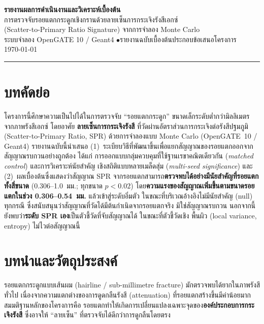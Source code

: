 \documentclass[14pt]{extarticle}
\begin{document}
\begin{center}
{\LARGE\bfseries\color{brand} รายงานผลการดำเนินงานและวิเคราะห์เบื้องต้น}\\[4pt]
{\Large การตรวจจับรอยแตกกระดูกเชิงกรานด้วยลายเซ็นการกระเจิงรังสีเอกซ์}\\
{\large (Scatter-to-Primary Ratio Signature) จากการจำลอง Monte Carlo}\\[8pt]
{\small ระบบจำลอง OpenGATE 10 / Geant4 \quad$\bullet$\quad รายงานฉบับเบื้องต้นประกอบข้อเสนอโครงการ}\\
{\small \today}
\end{center}
\vspace{4pt}
\hrule
\vspace{10pt}

\section*{บทคัดย่อ}
โครงการนี้ศึกษาความเป็นไปได้ในการตรวจจับ ``รอยแตกกระดูก'' ขนาดเล็กระดับต่ำกว่ามิลลิเมตร
จากภาพรังสีเอกซ์ โดยอาศัย \textbf{ลายเซ็นการกระเจิงรังสี} ที่วัดผ่านอัตราส่วนการกระเจิงต่อรังสีปฐมภูมิ
(Scatter-to-Primary Ratio, SPR) ด้วยการจำลองแบบ Monte Carlo (OpenGATE~10 / Geant4)
รายงานฉบับนี้นำเสนอ (1)~ระเบียบวิธีที่พัฒนาขึ้นเพื่อแยกสัญญาณของรอยแตกออกจากสัญญาณรบกวนอย่างถูกต้อง
ได้แก่ การออกแบบกลุ่มควบคุมที่ใช้ฐานเรขาคณิตเดียวกัน (\textit{matched control}) และการวิเคราะห์นัยสำคัญ
เชิงสถิติแบบหลายเมล็ดสุ่ม (\textit{multi-seed significance}) และ (2)~ผลเบื้องต้นซึ่งแสดงว่าสัญญาณ SPR
จากรอยแตกสามารถ\textbf{ตรวจพบได้อย่างมีนัยสำคัญที่รอยแตกทั้งสี่ขนาด} (0.306--1.0~มม.; ทุกขนาด $p<0.02$)
โดย\textbf{ความแรงของสัญญาณเพิ่มขึ้นตามขนาดรอยแตกในช่วง 0.306--0.54~มม.} แล้วเข้าสู่ระดับอิ่มตัว
ในขณะที่บริเวณอ้างอิงไม่มีนัยสำคัญ (null) ทุกกรณี ซึ่งสนับสนุนว่าสัญญาณที่วัดได้มีต้นกำเนิดจากรอยแตกจริง
มิใช่สัญญาณรบกวน นอกจากนี้ยังพบว่า\textbf{ระดับ SPR เอง}เป็นตัวชี้วัดที่จับสัญญาณได้ ในขณะที่ตัวชี้วัดเชิง
พื้นผิว (local variance, entropy) ไม่ไวต่อสัญญาณนี้

\section{บทนำและวัตถุประสงค์}
รอยแตกกระดูกแบบเส้นผม (hairline / sub-millimetre fracture) มักตรวจพบได้ยากในภาพรังสีทั่วไป
เนื่องจากความแตกต่างของการดูดกลืนรังสี (attenuation) ที่รอยแตกสร้างขึ้นมีค่าน้อยมาก
สมมติฐานหลักของโครงการคือ รอยแตกทำให้เกิดการเปลี่ยนแปลงเฉพาะจุดของ\textbf{องค์ประกอบการกระเจิงรังสี}
ซึ่งอาจให้ ``ลายเซ็น'' ที่ตรวจจับได้ดีกว่าการดูกลืนโดยตรง
\end{document}
